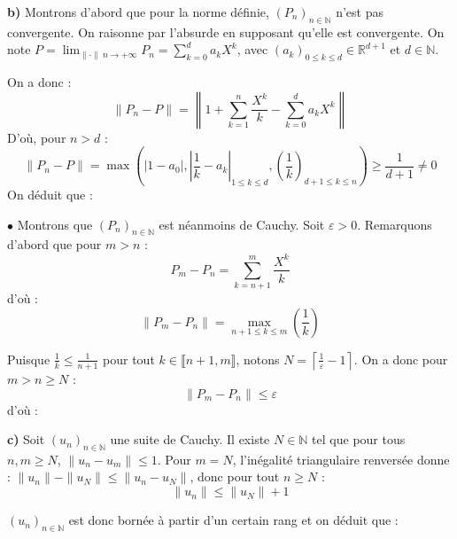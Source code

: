 \documentclass[11pt,a4paper]{report}
\begin{document}
\vspace{0.5cm}

\noindent \textbf{b)} Montrons d'abord que pour la norme définie, $(P_n)_{n \in \mathbb{N}}$ n'est pas convergente. On raisonne par l'absurde en supposant qu'elle est convergente. On note $P = \lim_{\|\cdot\| \ n \to +\infty} P_n = \sum_{k=0}^d a_k X^k$, avec $(a_k)_{0 \leqslant k \leqslant d} \in \mathbb{R}^{d+1}$ et $d \in \mathbb{N}$.

\noindent On a donc :
$$ \|P_n - P\| = \left\| 1 + \sum_{k=1}^n \frac{X^k}{k} - \sum_{k=0}^d a_k X^k \right\| $$
\noindent D'où, pour $n > d$ : 
$$ \|P_n - P\| = \max \left( |1-a_0|, \left| \frac{1}{k} - a_k \right| _{1 \leqslant k \leqslant d}, \left( \frac{1}{k} \right)_{d+1 \leqslant k \leqslant n} \right) \geqslant \frac{1}{d+1} \neq 0 $$
\noindent On déduit que :
\begin{center}
\end{center}

\noindent $\bullet$ Montrons que $(P_n)_{n \in \mathbb{N}}$ est néanmoins de Cauchy. Soit $\varepsilon > 0$. Remarquons d'abord que pour $m > n$ :
$$ P_m - P_n = \sum_{k=n+1}^m \frac{X^k}{k} $$
\noindent d'où :
$$ \|P_m - P_n\| = \max_{n+1 \leqslant k \leqslant m} \left( \frac{1}{k} \right) $$

\noindent Puisque $\frac{1}{k} \leqslant \frac{1}{n+1}$ pour tout $k \in \llbracket n+1, m \rrbracket$, notons $N = \left\lceil \frac{1}{\varepsilon} - 1 \right\rceil$. On a donc pour $m > n \geqslant N$ :
$$ \|P_m - P_n\| \leqslant \varepsilon $$
\noindent d'où :
\begin{center}
\end{center}

\vspace{0.5cm}

\noindent \textbf{c)} Soit $(u_n)_{n \in \mathbb{N}}$ une suite de Cauchy. Il existe $N \in \mathbb{N}$ tel que pour tous $n,m \geqslant N$, $\|u_n - u_m\| \leqslant 1$. Pour $m = N$, l'inégalité triangulaire renversée donne : $\|u_n\| - \|u_N\| \leqslant \|u_n - u_N\|$, donc pour tout $n \geqslant N$ :
$$ \boxed{ \|u_n\| \leqslant \|u_N\| + 1 } $$

\noindent $(u_n)_{n \in \mathbb{N}}$ est donc bornée à partir d'un certain rang et on déduit que :
\begin{center}
\end{center}
\end{document}
